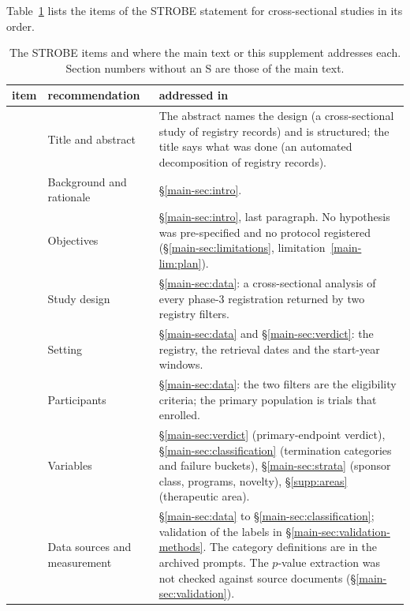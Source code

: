 \documentclass[11pt]{article}
\makeatletter
\renewcommand\section{\@startsection{section}{1}{\z@}{-3.5ex \@plus -1ex \@minus -.2ex}{2.3ex \@plus.2ex}{\normalfont\Large\bfseries\raggedright}}
\newcounter{strobe}
\newcommand{\strobeitem}{\stepcounter{strobe}\arabic{strobe}}
\makeatother
\begin{document}
\clearpage
\section{STROBE checklist}\label{supp:strobe}
Table~\ref{tab:strobe} lists the items of the STROBE statement for cross-sectional studies in its order.

\begin{table}[H]
\centering
\caption{The STROBE items and where the main text or this supplement addresses each. Section numbers without an S are those of the main text.}
\label{tab:strobe}
\footnotesize
\begin{tabular}{r>{\raggedright\arraybackslash}p{}>{\raggedright\arraybackslash}p{}}
\toprule
item & recommendation & addressed in \\
\midrule
\strobeitem & Title and abstract & The abstract names the design (a cross-sectional study of registry records) and is structured; the title says what was done (an automated decomposition of registry records). \\
\strobeitem & Background and rationale & \S\ref{main-sec:intro}. \\
\strobeitem & Objectives & \S\ref{main-sec:intro}, last paragraph. No hypothesis was pre-specified and no protocol registered (\S\ref{main-sec:limitations}, limitation~\ref{main-lim:plan}). \\
\strobeitem & Study design & \S\ref{main-sec:data}: a cross-sectional analysis of every phase-3 registration returned by two registry filters. \\
\strobeitem & Setting & \S\ref{main-sec:data} and \S\ref{main-sec:verdict}: the registry, the retrieval dates and the start-year windows. \\
\strobeitem & Participants & \S\ref{main-sec:data}: the two filters are the eligibility criteria; the primary population is trials that enrolled. \\
\strobeitem & Variables & \S\ref{main-sec:verdict} (primary-endpoint verdict), \S\ref{main-sec:classification} (termination categories and failure buckets), \S\ref{main-sec:strata} (sponsor class, programs, novelty), \S\ref{supp:areas} (therapeutic area). \\
\strobeitem & Data sources and measurement & \S\ref{main-sec:data} to \S\ref{main-sec:classification}; validation of the labels in \S\ref{main-sec:validation-methods}. The category definitions are in the archived prompts. The $p$-value extraction was not checked against source documents (\S\ref{main-sec:validation}). \\

\end{tabular}
\end{table}
\end{document}
